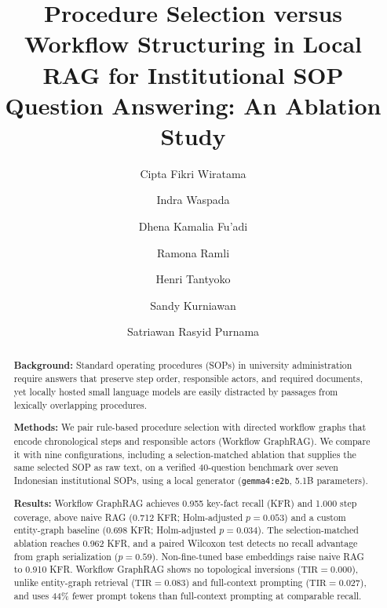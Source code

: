 \documentclass[preprint,10pt]{elsarticle}
\begin{document}



\begin{frontmatter}

\title{Procedure Selection versus Workflow Structuring in Local RAG for Institutional SOP Question Answering: An Ablation Study}

\author[undip]{Cipta Fikri Wiratama}

\author[undip]{Indra Waspada}

\author[undip]{Dhena Kamalia Fu'adi}

\author[usm]{Ramona Ramli}

\author[undip]{Henri Tantyoko}

\author[undip]{Sandy Kurniawan}

\author[undip]{Satriawan Rasyid Purnama}




\begin{abstract}
\textbf{Background:} Standard operating procedures (SOPs) in university administration require answers that preserve step order, responsible actors, and required documents, yet locally hosted small language models are easily distracted by passages from lexically overlapping procedures.

\textbf{Methods:} We pair rule-based procedure selection with directed workflow graphs that encode chronological steps and responsible actors (Workflow GraphRAG). We compare it with nine configurations, including a selection-matched ablation that supplies the same selected SOP as raw text, on a verified 40-question benchmark over seven Indonesian institutional SOPs, using a local generator (\texttt{gemma4:e2b}, 5.1B parameters).

\textbf{Results:} Workflow GraphRAG achieves 0.955 key-fact recall (KFR) and 1.000 step coverage, above naive RAG (0.712 KFR; Holm-adjusted $p=0.053$) and a custom entity-graph baseline (0.698 KFR; Holm-adjusted $p=0.034$). The selection-matched ablation reaches 0.962 KFR, and a paired Wilcoxon test detects no recall advantage from graph serialization ($p=0.59$). Non-fine-tuned base embeddings raise naive RAG to 0.910 KFR. Workflow GraphRAG shows no topological inversions ($\text{TIR}=0.000$), unlike entity-graph retrieval ($\text{TIR}=0.083$) and full-context prompting ($\text{TIR}=0.027$), and uses 44\% fewer prompt tokens than full-context prompting at comparable recall.


\end{abstract}
\end{frontmatter}
\end{document}
